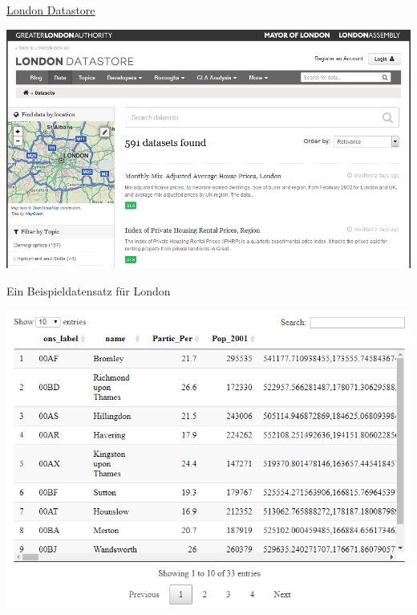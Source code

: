 \documentclass[ignorenonframetext,]{beamer}
\begin{document}
\begin{frame}{\href{http://data.london.gov.uk/dataset}{London
Datastore}}
\protect\hypertarget{london-datastore}{}

\includegraphics{figure/LondonData.PNG}

\end{frame}

\begin{frame}{Ein Beispieldatensatz für London}
\protect\hypertarget{ein-beispieldatensatz-fur-london}{}

\includegraphics{figure/LondonExample.PNG}

\end{frame}
\end{document}
